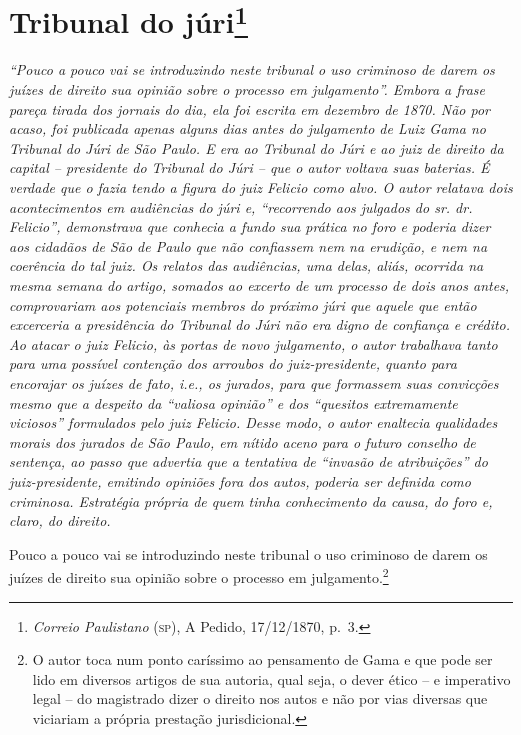 \chapter{Tribunal do júri\footnote{\emph{Correio Paulistano} (\textsc{sp}), A Pedido, 17/12/1870,
  p.~3.}} %

\begin{didascalia}
\emph{``Pouco a pouco vai se introduzindo neste tribunal o uso criminoso
de darem os juízes de direito sua opinião sobre o processo em
julgamento''. Embora a frase pareça tirada dos jornais do dia, ela foi
escrita em dezembro de 1870. Não por acaso, foi publicada apenas alguns
dias antes do julgamento de Luiz Gama no Tribunal do Júri de São Paulo.
E era ao Tribunal do Júri e ao juiz de direito da capital -- presidente
do Tribunal do Júri -- que o autor voltava suas baterias. É verdade que
o fazia tendo a figura do juiz Felicio como alvo. O autor relatava dois
acontecimentos em audiências do júri e, ``recorrendo aos julgados do sr.
dr. Felicio'', demonstrava que conhecia a fundo sua prática no foro e
poderia dizer aos cidadãos de São de Paulo que não confiassem nem na
erudição, e nem na coerência do tal juiz. Os relatos das audiências, uma
delas, aliás, ocorrida na mesma semana do artigo, somados ao excerto de
um processo de dois anos antes, comprovariam aos potenciais membros do
próximo júri que aquele que então excerceria a presidência do Tribunal
do Júri não era digno de confiança e crédito. Ao atacar o juiz Felicio,
às portas de novo julgamento, o autor trabalhava tanto para uma possível
contenção dos arroubos do juiz-presidente, quanto para encorajar os
juízes de fato, i.e., os jurados, para que formassem suas convicções
mesmo que a despeito da ``valiosa opinião'' e dos ``quesitos extremamente
viciosos'' formulados pelo juiz Felicio. Desse modo, o autor enaltecia
qualidades morais dos jurados de São Paulo, em nítido aceno para o
futuro conselho de sentença, ao passo que advertia que a tentativa de
``invasão de atribuições'' do juiz-presidente, emitindo opiniões fora dos
autos, poderia ser definida como criminosa. Estratégia própria de quem
tinha conhecimento da causa, do foro e, claro, do direito.}
\end{didascalia}

Pouco a pouco vai se introduzindo neste tribunal o uso criminoso de
darem os juízes de direito sua opinião sobre o processo em
julgamento.\footnote{ O autor toca num ponto caríssimo ao pensamento de
  Gama e que pode ser lido em diversos artigos de sua autoria, qual
  seja, o dever ético -- e imperativo legal -- do magistrado dizer o
  direito nos autos e não por vias diversas que viciariam a própria
  prestação jurisdicional.}

